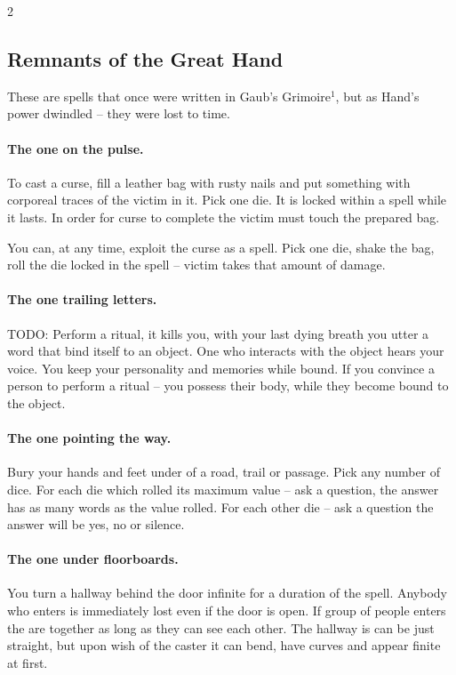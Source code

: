

\label{sec:forgotten}

\begin{multicols*}{2}

\subsection*{Remnants of the Great Hand}

These are spells that once were written in Gaub's Grimoire$^1$, but as Hand's power dwindled -- they were lost to time.

\paragraph{The one on the pulse.} To cast a curse, fill a leather bag with rusty nails and put something with corporeal traces of the victim in it.
Pick one die. It is locked within a spell while it lasts. 
In order for curse to complete the victim must touch the prepared bag.

You can, at any time, exploit the curse as a spell.
Pick one die, shake the bag, roll the die locked in the spell -- victim takes that amount of damage. 

\paragraph{The one trailing letters.} TODO: Perform a ritual, it kills you, with your last dying breath you utter a word that bind itself to an object.
One who interacts with the object hears your voice. You keep your personality and memories while bound. 
If you convince a person to perform a ritual -- you possess their body, while they become bound to the object.

\paragraph{The one pointing the way.} Bury your hands and feet under of a road, trail or passage. 
Pick any number of dice. For each die which rolled its maximum value -- ask a question, the answer has as many words as the value rolled.
For each other die -- ask a question the answer will be yes, no or silence.

\paragraph{The one under floorboards.} You turn a hallway behind the door infinite for a duration of the spell. 
Anybody who enters is immediately lost even if the door is open. If group of people enters the are together as long as they can see each other. 
The hallway is can be just straight, but upon wish of the caster it can bend, have curves and appear finite at first. 


\end{multicols*}
